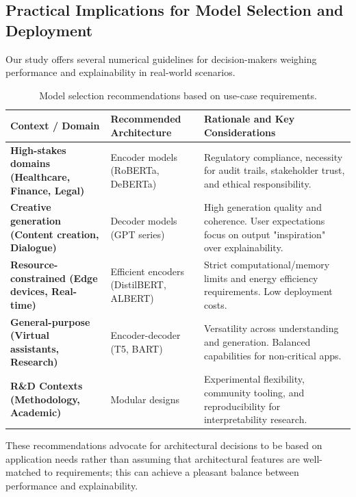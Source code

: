 \documentclass[preprint,12pt]{elsarticle}
\begin{document}
\subsection{Practical Implications for Model Selection and Deployment}

Our study offers several numerical guidelines for decision-makers weighing performance and explainability in real-world scenarios.

\begin{table}[ht!]
\centering
\caption{Model selection recommendations based on use-case requirements.}
\label{tab:recommendations}
\small %
\begin{tabularx}{\textwidth}{@{} >{\RaggedRight\bfseries}p{3.5cm} >{\RaggedRight}p{3cm} L @{}}
\toprule
\textbf{Context / Domain} & \textbf{Recommended Architecture} & \textbf{Rationale and Key Considerations} \\
\midrule
\textbf{High-stakes domains} (Healthcare, Finance, Legal) & Encoder models (RoBERTa, DeBERTa) & Regulatory compliance, necessity for audit trails, stakeholder trust, and ethical responsibility. \\
\addlinespace
\textbf{Creative generation} (Content creation, Dialogue) & Decoder models (GPT series) & High generation quality and coherence. User expectations focus on output "inspiration" over explainability. \\
\addlinespace
\textbf{Resource-constrained} (Edge devices, Real-time) & Efficient encoders (DistilBERT, ALBERT) & Strict computational/memory limits and energy efficiency requirements. Low deployment costs. \\
\addlinespace
\textbf{General-purpose} (Virtual assistants, Research) & Encoder-decoder (T5, BART) & Versatility across understanding and generation. Balanced capabilities for non-critical apps. \\
\addlinespace
\textbf{R\&D Contexts} (Methodology, Academic) & Modular designs & Experimental flexibility, community tooling, and reproducibility for interpretability research. \\
\bottomrule
\end{tabularx}
\end{table}

These recommendations advocate for architectural decisions to be based on application needs rather than assuming that architectural features are well-matched to requirements; this can achieve a pleasant balance between performance and explainability.
\end{document}
